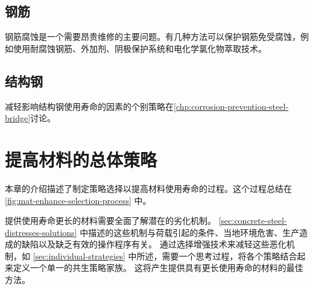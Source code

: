 \subsection{钢筋}
钢筋腐蚀是一个需要昂贵维修的主要问题。有几种方法可以保护钢筋免受腐蚀，例如使用耐腐蚀钢筋、外加剂、阴极保护系统和电化学氯化物萃取技术。

\subsection{结构钢}
减轻影响结构钢使用寿命的因素的个别策略在\cref{chp:corrosion-prevention-steel-bridge}讨论。

\section{提高材料的总体策略}
\label{sec:overall-strategies}
本章的介绍描述了制定策略选择以提高材料使用寿命的过程。这个过程总结在\cref{fig:mat-enhance-selection-process} 中。

提供使用寿命更长的材料需要全面了解潜在的{劣化}机制。 \cref{sec:concrete-steel-distresses-solutions} 中描述的这些机制与荷载引起的条件、当地环境危害、生产造成的缺陷以及缺乏有效的操作程序有关。 通过选择增强技术来减轻这些恶化机制，如 \cref{sec:individual-strategies} 中所述，需要一个思考过程，将各个策略结合起来定义一个单一的共生策略家族。 这将产生提供具有更长使用寿命的材料的最佳方法。

